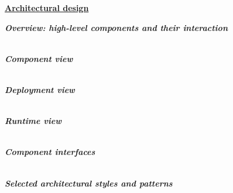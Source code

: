 \documentclass{report}
\begin{document}
	\underline{\textbf{Architectural design} }
	\begin{legal}
    		\item \textit{\textbf{Overview: high-level components and their interaction}}\\\\
		
		\item \textit{\textbf{Component view}}\\\\
		\item \textit{\textbf{Deployment view}}\\\\
		\item \textit{\textbf{Runtime view}}\\\\
		\item \textit{\textbf{Component interfaces}}\\\\
		\item \textit{\textbf{Selected architectural styles and patterns}}\\\\
  	\end{legal}
	
\end{document}
